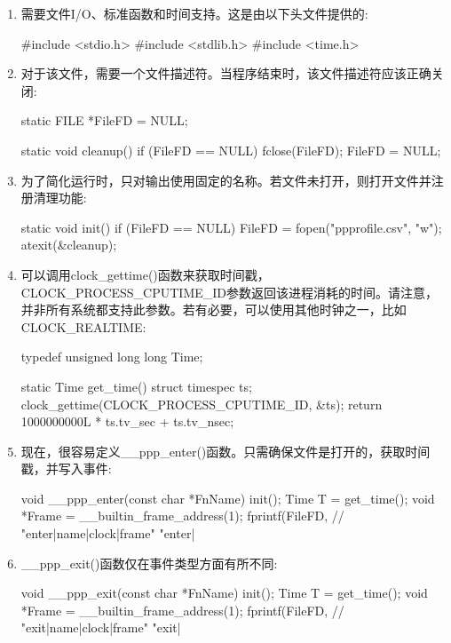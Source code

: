 \begin{enumerate}
\item
需要文件I/O、标准函数和时间支持。这是由以下头文件提供的:

\begin{cpp}
#include <stdio.h>
#include <stdlib.h>
#include <time.h>
\end{cpp}

\item
对于该文件，需要一个文件描述符。当程序结束时，该文件描述符应该正确关闭:

\begin{cpp}
static FILE *FileFD = NULL;

static void cleanup() {
    if (FileFD == NULL) {
        fclose(FileFD);
        FileFD = NULL;
    }
}
\end{cpp}

\item
为了简化运行时，只对输出使用固定的名称。若文件未打开，则打开文件并注册清理功能:

\begin{cpp}
static void init() {
    if (FileFD == NULL) {
        FileFD = fopen("ppprofile.csv", "w");
        atexit(&cleanup);
    }
}
\end{cpp}

\item
可以调用clock\_gettime()函数来获取时间戳，CLOCK\_PROCESS\_CPUTIME\_ID参数返回该进程消耗的时间。请注意，并非所有系统都支持此参数。若有必要，可以使用其他时钟之一，比如CLOCK\_REALTIME:

\begin{cpp}
typedef unsigned long long Time;

static Time get_time() {
    struct timespec ts;
    clock_gettime(CLOCK_PROCESS_CPUTIME_ID, &ts);
    return 1000000000L * ts.tv_sec + ts.tv_nsec;
}
\end{cpp}

\item
现在，很容易定义\_\_ppp\_enter()函数。只需确保文件是打开的，获取时间戳，并写入事件:

\begin{cpp}
void __ppp_enter(const char *FnName) {
    init();
    Time T = get_time();
    void *Frame = __builtin_frame_address(1);
    fprintf(FileFD,
            // "enter|name|clock|frame"
            "enter|%
}
\end{cpp}

\item
\_\_ppp\_exit()函数仅在事件类型方面有所不同:

\begin{cpp}
void __ppp_exit(const char *FnName) {
    init();
    Time T = get_time();
    void *Frame = __builtin_frame_address(1);
    fprintf(FileFD,
    // "exit|name|clock|frame"
    "exit|%
}
\end{cpp}

\end{enumerate}

